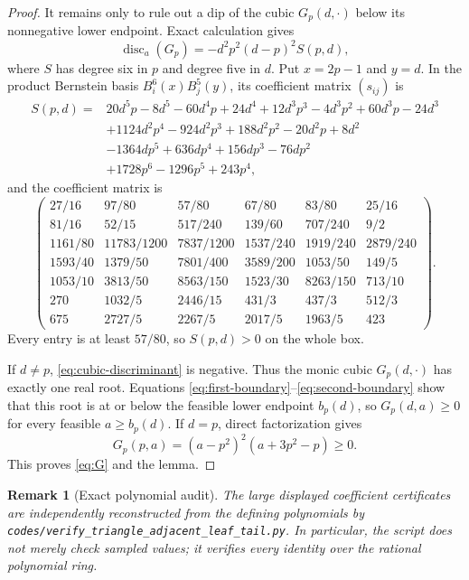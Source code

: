 \documentclass[11pt]{article}
\newtheorem{remark}[theorem]{Remark}
\begin{document}
\begin{proof}
It remains only to rule out a dip of the cubic $G_p(d,\cdot)$ below its
nonnegative lower endpoint.  Exact calculation gives
\begin{equation}
 \operatorname{disc}_a(G_p)
 =-d^2p^2(d-p)^2S(p,d),
 \label{eq:cubic-discriminant}
\end{equation}
where $S$ has degree six in $p$ and degree five in $d$.  Put
$x=2p-1$ and $y=d$.  In the product Bernstein basis
$B_i^6(x)B_j^5(y)$, its coefficient matrix $(s_{ij})$ is
\begin{align*}
S(p,d)={}&20d^5p-8d^5-60d^4p+24d^4
 +12d^3p^3-4d^3p^2+60d^3p-24d^3\\
&+1124d^2p^4-924d^2p^3+188d^2p^2-20d^2p+8d^2\\
&-1364dp^5+636dp^4+156dp^3-76dp^2\\
&+1728p^6-1296p^5+243p^4,
\end{align*}
and the coefficient matrix is
\[
\begin{pmatrix}
27/16&97/80&57/80&67/80&83/80&25/16\\
81/16&52/15&517/240&139/60&707/240&9/2\\
1161/80&11783/1200&7837/1200&1537/240&1919/240&2879/240\\
1593/40&1379/50&7801/400&3589/200&1053/50&149/5\\
1053/10&3813/50&8563/150&1523/30&8263/150&713/10\\
270&1032/5&2446/15&431/3&437/3&512/3\\
675&2727/5&2267/5&2017/5&1963/5&423
\end{pmatrix}.
\]
Every entry is at least $57/80$, so $S(p,d)>0$ on the whole box.

If $d\neq p$, \eqref{eq:cubic-discriminant} is negative.  Thus the monic
cubic $G_p(d,\cdot)$ has exactly one real root.  Equations
\eqref{eq:first-boundary}--\eqref{eq:second-boundary} show that this root is
at or below the feasible lower endpoint $b_p(d)$, so $G_p(d,a)\geq0$ for
every feasible $a\geq b_p(d)$.  If $d=p$, direct factorization gives
\[
 G_p(p,a)=(a-p^2)^2(a+3p^2-p)\geq0.
\]
This proves \eqref{eq:G} and the lemma.
\end{proof}

\begin{remark}[Exact polynomial audit]
The large displayed coefficient certificates are independently reconstructed
from the defining polynomials by
\texttt{codes/verify\_triangle\_adjacent\_leaf\_tail.py}.  In particular,
the script does not merely check sampled values; it verifies every identity
over the rational polynomial ring.
\end{remark}
\end{document}
